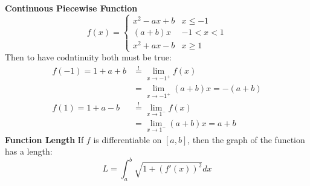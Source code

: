 \documentclass[8pt,a4paper]{extarticle}     %
\theoremstyle{definition}
\theoremstyle{definition}
\theoremstyle{definition}
\begin{document}
\begin{multicols}{4}
\textbf{Continuous Piecewise Function}
\[ f(x)=
	\begin{cases}
		x^2-ax+b & x\leq -1 \\
		(a+b)x & -1<x<1 \\
		x^2+ax-b & x \geq 1
	\end{cases}
\]
Then to have codntinuity both must be true: \\
\[
\begin{split}
	f(-1) = 1+a+b &\stackrel{!}{=} \lim_{x\to-1^+}f(x) \\
	&= \lim_{x\to-1^+}(a+b)x = -(a+b) \\
	f(1) = 1+a-b &\stackrel{!}{=} \lim_{x\to 1^-}f(x) \\
	&= \lim_{x\to 1^-}(a+b)x = a+b
\end{split}
\]
\textbf{Function Length}
If $f$ is differentiable on $[a,b]$, then the graph of the function has a length:
$$L = \int_a^{b} \sqrt{1+(f'(x))^2}dx$$


\vfill\eject
\columnbreak



\end{multicols}
\end{document}
